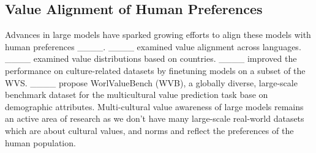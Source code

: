 
\subsection{Value Alignment of Human Preferences}
Advances in large models have sparked
growing efforts to align these models with human preferences ____. ____ examined value alignment across languages. ____ examined value distributions based on countries. ____ improved the performance on culture-related datasets by finetuning models on a subset of the WVS.
____ propose WorlValueBench
(WVB), a globally diverse, large-scale benchmark
dataset for the multicultural value prediction
task base on demographic attributes. Multi-cultural value awareness of large models remains an active area of research as we don't have many large-scale real-world datasets which are about cultural values, and norms and reflect the preferences of the human population.


